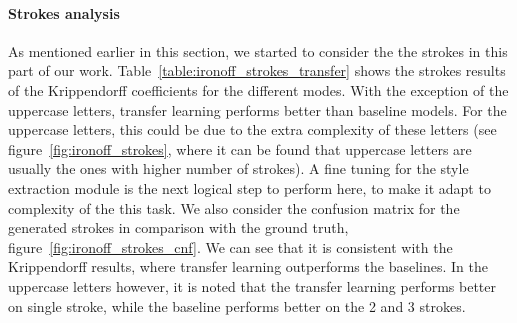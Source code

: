     \paragraph{Strokes analysis}
    As mentioned earlier in this section, we started to consider the the strokes in this part of our work. Table~\ref{table:ironoff_strokes_transfer} shows the strokes results of the Krippendorff coefficients for the different modes. With the exception of the uppercase letters, transfer learning performs better than baseline models. For the uppercase letters, this could be due to the extra complexity of these letters (see figure~\ref{fig:ironoff_strokes}, where it can be found that uppercase letters are usually the ones with higher number of strokes). A fine tuning for the style extraction module is the next logical step to perform here, to make it adapt to complexity of the this task. We also consider the confusion matrix for the generated strokes in comparison with the ground truth, figure~\ref{fig:ironoff_strokes_cnf}. We can see that it is consistent with the Krippendorff results, where transfer learning outperforms the baselines. In the uppercase letters however, it is noted that the transfer learning performs better on single stroke, while the baseline performs better on the 2 and 3 strokes.

